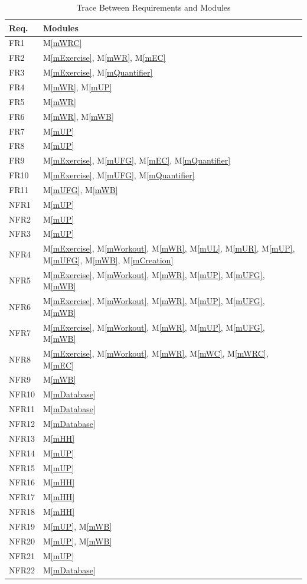 \documentclass[12pt, titlepage]{article}
\newcommand{\mref}[1]{M\ref{#1}}
\begin{document}
\begin{table}[H]
\centering
\begin{tabular}{p{} p{}}
\toprule
\textbf{Req.} & \textbf{Modules}\\
\midrule
FR1 & \mref{mWRC}\\
FR2 & \mref{mExercise}, \mref{mWR}, \mref{mEC}\\
FR3 & \mref{mExercise}, \mref{mQuantifier}\\
FR4 & \mref{mWR}, \mref{mUP}\\
FR5 & \mref{mWR}\\
FR6 & \mref{mWR}, \mref{mWB}\\
FR7 & \mref{mUP}\\
FR8 & \mref{mUP}\\
FR9 & \mref{mExercise}, \mref{mUFG}, \mref{mEC}, \mref{mQuantifier}\\
FR10 & \mref{mExercise}, \mref{mUFG}, \mref{mQuantifier}\\
FR11 & \mref{mUFG}, \mref{mWB}\\
\midrule
NFR1 & \mref{mUP}\\
NFR2 & \mref{mUP}\\
NFR3 & \mref{mUP}\\
NFR4 & \mref{mExercise}, \mref{mWorkout}, \mref{mWR}, \mref{mUL}, \mref{mUR}, \mref{mUP}, \mref{mUFG}, \mref{mWB}, \mref{mCreation}\\
NFR5 & \mref{mExercise}, \mref{mWorkout}, \mref{mWR}, \mref{mUP}, \mref{mUFG}, \mref{mWB}\\
NFR6 & \mref{mExercise}, \mref{mWorkout}, \mref{mWR}, \mref{mUP}, \mref{mUFG}, \mref{mWB}\\
NFR7 & \mref{mExercise}, \mref{mWorkout}, \mref{mWR}, \mref{mUP}, \mref{mUFG}, \mref{mWB}\\
NFR8 & \mref{mExercise}, \mref{mWorkout}, \mref{mWR}, \mref{mWC}, \mref{mWRC}, \mref{mEC}\\
NFR9 & \mref{mWB}\\
NFR10 & \mref{mDatabase}\\
NFR11 & \mref{mDatabase}\\
NFR12 & \mref{mDatabase}\\
NFR13 & \mref{mHH}\\
NFR14 & \mref{mUP}\\
NFR15 & \mref{mUP}\\
NFR16 & \mref{mHH}\\
NFR17 & \mref{mHH}\\
NFR18 & \mref{mHH}\\
NFR19 & \mref{mUP}, \mref{mWB}\\
NFR20 & \mref{mUP}, \mref{mWB}\\
NFR21 & \mref{mUP}\\
NFR22 & \mref{mDatabase}\\

\bottomrule
\end{tabular}
\caption{Trace Between Requirements and Modules}
\label{TblRT}
\end{table}
\end{document}
